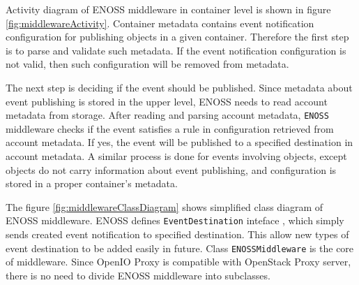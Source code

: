     Activity diagram of ENOSS middleware in container level is shown in figure \ref{fig:middlewareActivity}. Container metadata contains event notification configuration for publishing objects in a given container. Therefore the first step is to parse and validate such metadata. If the event notification configuration is not valid, then such configuration will be removed from metadata.

    The next step is deciding if the event should be published. Since metadata about event publishing is stored in the upper level, ENOSS needs to read account metadata from storage. After reading and parsing account metadata, \texttt{ENOSS} middleware checks if the event satisfies a rule in configuration retrieved from account metadata. If yes, the event will be published to a specified destination in account metadata. A similar process is done for events involving objects, except objects do not carry information about event publishing, and configuration is stored in a proper container's metadata.

    The figure \ref{fig:middlewareClassDiagram} shows simplified class diagram of ENOSS middleware. ENOSS defines \texttt{EventDestination} inteface , which simply sends created event notification to specified destination. This allow new types of event destination to be added easily in future. Class \texttt{ENOSSMiddleware} is the core of middleware. Since OpenIO Proxy is compatible with OpenStack Proxy server, there is no need to divide ENOSS middleware into subclasses.


